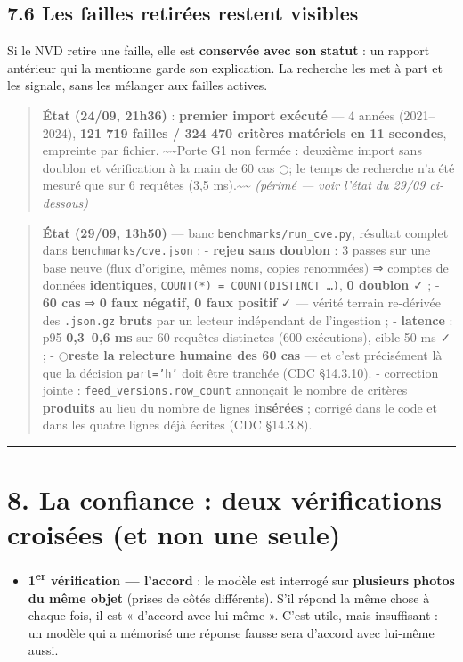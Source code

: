 \documentclass[11pt,a4paper]{article}
\newcommand{\afaire}{\textcolor{orange!85!black}{$\bigcirc$}}  %
\begin{document}
\subsection*{7.6 Les failles retirées restent visibles}
Si le NVD retire une faille, elle est \textbf{conservée avec son statut} : un rapport antérieur qui la mentionne garde son explication. La recherche les met à part et les signale, sans les mélanger aux failles actives.

\begin{quote}\small \textbf{État (24/09, 21h36)} : \textbf{premier import exécuté} — 4 années (2021–2024), \textbf{121 719 failles / 324 470 critères matériels en 11 secondes}, empreinte par fichier. \textasciitilde{}\textasciitilde{}Porte G1 non fermée : deuxième import sans doublon et vérification à la main de 60 cas \afaire ; le temps de recherche n'a été mesuré que sur 6 requêtes (3,5 ms).\textasciitilde{}\textasciitilde{} \textit{(périmé — voir l'état du 29/09 ci-dessous)}\end{quote}
\begin{quote}\small \textbf{État (29/09, 13h50)} — banc \texttt{benchmarks/run\_\allowbreak{}cve.py}, résultat complet dans \texttt{benchmarks/cve.json} : - \textbf{rejeu sans doublon} : 3 passes sur une base neuve (flux d'origine, mêmes noms, copies renommées) ⇒ comptes de données \textbf{identiques}, \texttt{COUNT(*) = COUNT(DISTINCT …)}, \textbf{0 doublon} ✓ ; - \textbf{60 cas} ⇒ \textbf{0 faux négatif, 0 faux positif} ✓ — vérité terrain re-dérivée des \texttt{.json.gz} \textbf{bruts} par un lecteur indépendant de l'ingestion ; - \textbf{latence} : p95 \textbf{0,3–0,6 ms} sur 60 requêtes distinctes (600 exécutions), cible 50 ms ✓ ; - \afaire \textbf{reste la relecture humaine des 60 cas} — et c'est précisément là que la décision \texttt{part='h'} doit être tranchée (CDC §14.3.10). - correction jointe : \texttt{feed\_\allowbreak{}versions.row\_\allowbreak{}count} annonçait le nombre de critères \textbf{produits} au lieu du nombre de lignes \textbf{insérées} ; corrigé dans le code et dans les quatre lignes déjà écrites (CDC §14.3.8).\end{quote}
\medskip\hrule\medskip
\section*{8. La confiance : deux vérifications croisées (et non une seule)}
\begin{itemize}  \item \textbf{1\textsuperscript{er} vérification — l'accord} : le modèle est interrogé sur \textbf{plusieurs photos du même objet} (prises de côtés différents). S'il répond la même chose à chaque fois, il est « d'accord avec lui-même ». C'est utile, mais insuffisant : un modèle qui a mémorisé une réponse fausse sera d'accord avec lui-même aussi.
\end{itemize}
\end{document}
